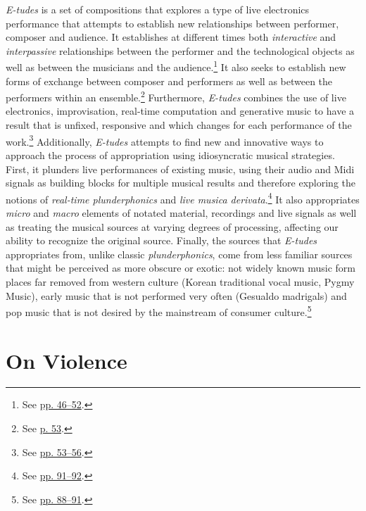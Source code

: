 \emph{E-tudes} is a set of compositions that explores a type of live electronics performance that attempts to establish new relationships between performer, composer and audience. It establishes at different times both \emph{interactive} and \emph{interpassive} relationships between the performer and the technological objects as well as between the musicians and the audience.\footnote{See \hyperlink{relaudience}{pp. 46--52}.} It also seeks to establish new forms of exchange between composer and performers as well as between the performers within an ensemble.\footnote{See \hyperlink{ensembledy}{p. 53}.} Furthermore, \emph{E-tudes} combines the use of live electronics, improvisation, real-time computation and generative music to have a result that is unfixed, responsive and which changes for each performance of the work.\footnote{See \hyperlink{techcomp}{pp. 53--56}.} Additionally, \emph{E-tudes} attempts to find new and innovative ways to approach the process of appropriation using idiosyncratic musical strategies. First, it plunders live performances of existing music, using their audio and Midi signals as building blocks for multiple musical results and therefore exploring the notions of \emph{real-time plunderphonics} and \emph{live musica derivata}.\footnote{See \hyperlink{realtimeplunderfuck}{pp. 91--92}.} It also appropriates \emph{micro} and \emph{macro} elements of notated material, recordings and live signals as well as treating the musical sources at varying degrees of processing, affecting our ability to recognize the original source. Finally, the sources that \emph{E-tudes} appropriates from, unlike classic \emph{plunderphonics}, come from less familiar sources that might be perceived as more obscure or exotic: not widely known music form places far removed from western culture (Korean traditional vocal music, Pygmy Music), early music that is not performed very often (Gesualdo madrigals) and pop music that is not desired by the mainstream of consumer culture.\footnote{See \hyperlink{appropstrat}{pp. 88--91}.}

\section{On Violence}
 
